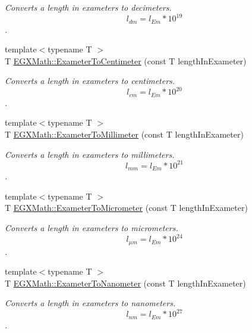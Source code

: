 \begin{DoxyCompactItemize}
\begin{DoxyCompactList}\small\item\em Converts a length in exameters to decimeters. \[ l_{dm}=l_{Em} * 10^{19} \]. \end{DoxyCompactList}\item 
{\footnotesize template$<$typename T $>$ }\\T \mbox{\hyperlink{group___e_g_x_math-_conversions-_length_conversions-_s_i-_exameter-_s_i_ga6f379e6cd3c3523fb3ff16eadcbefba9}{E\+G\+X\+Math\+::\+Exameter\+To\+Centimeter}} (const T length\+In\+Exameter)
\begin{DoxyCompactList}\small\item\em Converts a length in exameters to centimeters. \[ l_{cm}=l_{Em} * 10^{20} \]. \end{DoxyCompactList}\item 
{\footnotesize template$<$typename T $>$ }\\T \mbox{\hyperlink{group___e_g_x_math-_conversions-_length_conversions-_s_i-_exameter-_s_i_ga71baa21a517793479c9bbb9e1a5c713b}{E\+G\+X\+Math\+::\+Exameter\+To\+Millimeter}} (const T length\+In\+Exameter)
\begin{DoxyCompactList}\small\item\em Converts a length in exameters to millimeters. \[ l_{mm}=l_{Em} * 10^{21} \]. \end{DoxyCompactList}\item 
{\footnotesize template$<$typename T $>$ }\\T \mbox{\hyperlink{group___e_g_x_math-_conversions-_length_conversions-_s_i-_exameter-_s_i_gaee4a8b1fa77d023e7db7180e62646388}{E\+G\+X\+Math\+::\+Exameter\+To\+Micrometer}} (const T length\+In\+Exameter)
\begin{DoxyCompactList}\small\item\em Converts a length in exameters to micrometers. \[ l_{\mu m}=l_{Em} * 10^{24} \]. \end{DoxyCompactList}\item 
{\footnotesize template$<$typename T $>$ }\\T \mbox{\hyperlink{group___e_g_x_math-_conversions-_length_conversions-_s_i-_exameter-_s_i_ga78c5c3f8008fc44c81b3d89b44d3db19}{E\+G\+X\+Math\+::\+Exameter\+To\+Nanometer}} (const T length\+In\+Exameter)
\begin{DoxyCompactList}\small\item\em Converts a length in exameters to nanometers. \[ l_{nm}=l_{Em} * 10^{27} \]. \end{DoxyCompactList}\item 

\end{DoxyCompactItemize}
